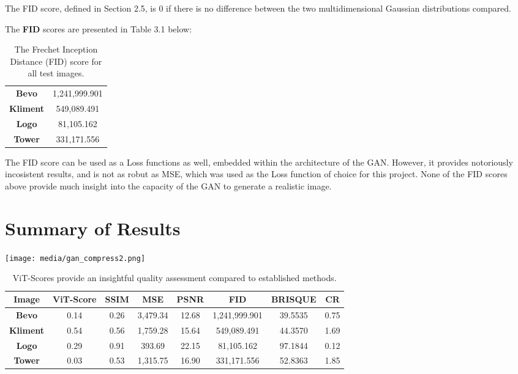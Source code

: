 The FID score, defined in Section 2.5, is 0 if there is no difference between the two multidimensional 
Gaussian distributions compared. 

\vspace{5mm}

The \textbf{FID} scores are presented in Table 3.1 below:

\begin{table}[H]
    \begin{center}
    \begin{tabular}{|c|c|}
        \hline
    \textbf{Bevo}	& 1,241,999.901 \\
    \textbf{Kliment}	& 549,089.491\\
    \textbf{Logo}	& 81,105.162\\
    \textbf{Tower} & 331,171.556\\\hline
    
    \end{tabular}
    \caption[FID Score]{The Frechet Inception Distance (FID) score for all test images.}
    \end{center}
    \end{table}


The FID score can be used as a Loss functions as well, embedded within the architecture of the GAN.
However, it provides notoriously incosistent results, and is not as robut as MSE, which was used as 
the Loss function of choice for this project. None of the FID scores above provide much insight 
into the capacity of the GAN to generate a realistic image. 


\section{Summary of Results}

\begin{center}
	\texttt{[image: media/gan\_compress2.png]}
\end{center}

\begin{table}[H]
    \begin{center}
    \begin{tabular}{|c|c|c|c|c|c|c|c|}
    \hline
    \textbf{Image}	& \textbf{ViT-Score} & \textbf{SSIM} & \textbf{MSE} & \textbf{PSNR} & \textbf{FID}  & \textbf{BRISQUE} & \textbf{CR}\\
    \hline
    \textbf{Bevo}	 & 0.14 & 0.26 & 3,479.34  &  12.68  &  1,241,999.901  &  39.5535 & 0.75 \\
    \textbf{Kliment} & 0.54 & 0.56 & 1,759.28 & 15.64  &  549,089.491 & 44.3570 & 1.69\\
    \textbf{Logo}	 & 0.29 & 0.91 & 393.69 & 22.15 &  81,105.162 & 97.1844 & 0.12 \\
    \textbf{Tower}   & 0.03 & 0.53 & 1,315.75 & 16.90 &  331,171.556 & 52.8363 & 1.85\\\hline
    
    \end{tabular}
    \caption[Summary of Results]{ViT-Scores provide an insightful quality assessment compared to established methods.}
    \end{center}
    \end{table}
